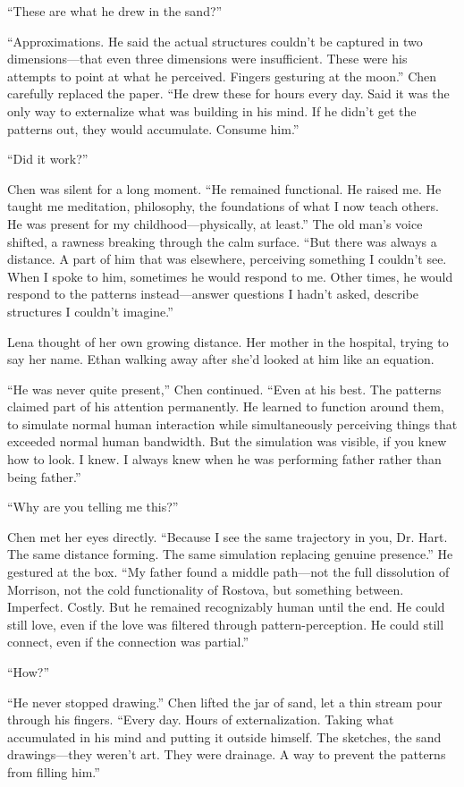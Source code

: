 ``These are what he drew in the sand?''

``Approximations. He said the actual structures couldn't be captured in two dimensions—that even three dimensions were insufficient. These were his attempts to point at what he perceived. Fingers gesturing at the moon.'' Chen carefully replaced the paper. ``He drew these for hours every day. Said it was the only way to externalize what was building in his mind. If he didn't get the patterns out, they would accumulate. Consume him.''

``Did it work?''

Chen was silent for a long moment. ``He remained functional. He raised me. He taught me meditation, philosophy, the foundations of what I now teach others. He was present for my childhood—physically, at least.'' The old man's voice shifted, a rawness breaking through the calm surface. ``But there was always a distance. A part of him that was elsewhere, perceiving something I couldn't see. When I spoke to him, sometimes he would respond to me. Other times, he would respond to the patterns instead—answer questions I hadn't asked, describe structures I couldn't imagine.''

Lena thought of her own growing distance. Her mother in the hospital, trying to say her name. Ethan walking away after she'd looked at him like an equation.

``He was never quite present,'' Chen continued. ``Even at his best. The patterns claimed part of his attention permanently. He learned to function around them, to simulate normal human interaction while simultaneously perceiving things that exceeded normal human bandwidth. But the simulation was visible, if you knew how to look. I knew. I always knew when he was performing father rather than being father.''

``Why are you telling me this?''

Chen met her eyes directly. ``Because I see the same trajectory in you, Dr. Hart. The same distance forming. The same simulation replacing genuine presence.'' He gestured at the box. ``My father found a middle path—not the full dissolution of Morrison, not the cold functionality of Rostova, but something between. Imperfect. Costly. But he remained recognizably human until the end. He could still love, even if the love was filtered through pattern-perception. He could still connect, even if the connection was partial.''

``How?''

``He never stopped drawing.'' Chen lifted the jar of sand, let a thin stream pour through his fingers. ``Every day. Hours of externalization. Taking what accumulated in his mind and putting it outside himself. The sketches, the sand drawings—they weren't art. They were drainage. A way to prevent the patterns from filling him.''

